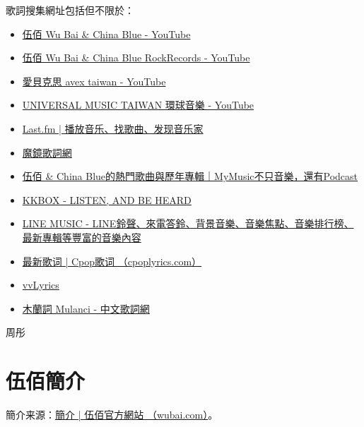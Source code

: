 \documentclass[UTF8,a4paper,oneside,twocolumn,12pt]{ctexbook}
\begin{document}
歌詞搜集網址包括但不限於：
\begin{itemize}
	\item \href{https://www.youtube.com/channel/UCHocIer4qdnCmgvHlNrpqFA}{伍佰 Wu Bai \& China Blue - YouTube}
	\item \href{https://www.youtube.com/channel/UCCTYHJZvsRCLvm5Afi9XJXA}{伍佰 Wu Bai \& China Blue RockRecords - YouTube}
	\item \href{https://www.youtube.com/c/愛貝克思avextaiwan}{愛貝克思 avex taiwan - YouTube}
	\item \href{https://www.youtube.com/c/universaltwn/search?query=伍佰}{UNIVERSAL MUSIC TAIWAN 環球音樂 - YouTube}
	\item \href{https://www.last.fm/zh/}{Last.fm | 播放音乐、找歌曲、发现音乐家}
	\item \href{https://mojim.com/twznew.htm}{魔鏡歌詞網}
	\item \href{https://www.mymusic.net.tw/ux/w/singer/show/245}{伍佰 \& China Blue的熱門歌曲與歷年專輯｜MyMusic不只音樂，還有Podcast}
	\item \href{https://www.kkbox.com/tw/tc/}{KKBOX - LISTEN, AND BE HEARD}
	\item \href{https://music-tw.line.me/}{LINE MUSIC - LINE鈴聲、來電答鈴、背景音樂、音樂焦點、音樂排行榜、最新專輯等豐富的音樂內容}
	\item \href{https://www.cpoplyrics.com/}{最新歌词 | Cpop歌词 （cpoplyrics.com）}
	\item \href{https://vvlyrics.com/}{vvLyrics}
	\item \href{https://www.mulanci.org/zht/}{木蘭詞 Mulanci - 中文歌詞網}
\end{itemize}

\begin{flushright}
	周彤
\end{flushright}

\chapter*{伍佰簡介}
簡介来源：\href{http://wubai.com/biography/%e7%b0%a1%e4%bb%8b/}{簡介 | 伍佰官方網站 （wubai.com）}。
\end{document}
